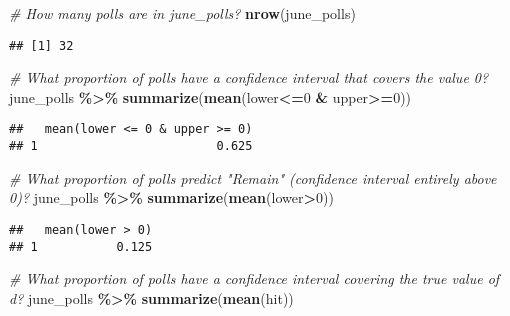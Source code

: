 \documentclass[
]{article}
\newenvironment{Shaded}{\begin{snugshade}}{\end{snugshade}}
\newcommand{\CommentTok}[1]{\textcolor[rgb]{0.56,0.35,0.01}{\textit{#1}}}
\newcommand{\DecValTok}[1]{\textcolor[rgb]{0.00,0.00,0.81}{#1}}
\newcommand{\KeywordTok}[1]{\textcolor[rgb]{0.13,0.29,0.53}{\textbf{#1}}}
\newcommand{\NormalTok}[1]{#1}
\newcommand{\OperatorTok}[1]{\textcolor[rgb]{0.81,0.36,0.00}{\textbf{#1}}}
\newcommand{\StringTok}[1]{\textcolor[rgb]{0.31,0.60,0.02}{#1}}
\begin{document}
\begin{Shaded}
\begin{Highlighting}[]
\CommentTok{\# How many polls are in june\_polls?}
\KeywordTok{nrow}\NormalTok{(june\_polls)}
\end{Highlighting}
\end{Shaded}

\begin{verbatim}
## [1] 32
\end{verbatim}

\begin{Shaded}
\begin{Highlighting}[]
\CommentTok{\# What proportion of polls have a confidence interval that covers the value 0?}
\NormalTok{june\_polls }\OperatorTok{\%\textgreater{}\%}\StringTok{ }\KeywordTok{summarize}\NormalTok{(}\KeywordTok{mean}\NormalTok{(lower}\OperatorTok{\textless{}=}\DecValTok{0} \OperatorTok{\&}\StringTok{ }\NormalTok{upper}\OperatorTok{\textgreater{}=}\DecValTok{0}\NormalTok{))}
\end{Highlighting}
\end{Shaded}

\begin{verbatim}
##   mean(lower <= 0 & upper >= 0)
## 1                         0.625
\end{verbatim}

\begin{Shaded}
\begin{Highlighting}[]
\CommentTok{\# What proportion of polls predict "Remain" (confidence interval entirely above 0)?}
\NormalTok{june\_polls }\OperatorTok{\%\textgreater{}\%}\StringTok{ }\KeywordTok{summarize}\NormalTok{(}\KeywordTok{mean}\NormalTok{(lower}\OperatorTok{\textgreater{}}\DecValTok{0}\NormalTok{))}
\end{Highlighting}
\end{Shaded}

\begin{verbatim}
##   mean(lower > 0)
## 1           0.125
\end{verbatim}

\begin{Shaded}
\begin{Highlighting}[]
\CommentTok{\# What proportion of polls have a confidence interval covering the true value of d?}
\NormalTok{june\_polls }\OperatorTok{\%\textgreater{}\%}\StringTok{ }\KeywordTok{summarize}\NormalTok{(}\KeywordTok{mean}\NormalTok{(hit))}
\end{Highlighting}
\end{Shaded}
\end{document}
